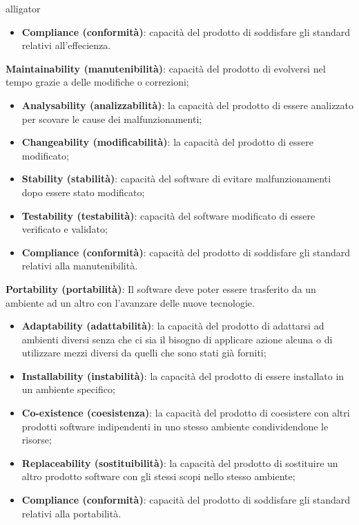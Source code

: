 \begin{labeling}{alligator}
\begin{itemize}
		\item \textbf{Compliance (conformità)}: capacità del prodotto di soddisfare gli standard relativi all'effecienza.
		
	\end{itemize}
	
	\item \textbf{Maintainability (manutenibilità)}: capacità del prodotto di evolversi nel tempo grazie a delle modifiche o correzioni;
	\begin{itemize}
		\item \textbf{Analysability (analizzabilità)}: la capacità del prodotto di essere analizzato per scovare le cause dei malfunzionamenti;
		
		\item \textbf{Changeability (modificabilità)}: la capacità del prodotto di essere modificato;
		
		\item \textbf{Stability (stabilità)}: capacità del software di evitare malfunzionamenti dopo essere stato modificato;
		
		\item \textbf{Testability (testabilità)}: capacità del software modificato di essere verificato e validato;
		
		\item \textbf{Compliance (conformità)}: capacità del prodotto di soddisfare gli standard relativi alla manutenibilità.
	\end{itemize}
	
	\item \textbf{Portability (portabilità)}: Il software deve poter essere trasferito da un ambiente ad un altro con l'avanzare delle nuove tecnologie.
	\begin{itemize}
		\item \textbf{Adaptability (adattabilità)}: la capacità del prodotto di adattarsi ad ambienti diversi senza che ci sia il bisogno di applicare azione alcuna o di utilizzare mezzi diversi da quelli che sono stati già forniti;
		
		\item \textbf{Installability (instabilità)}: la capacità del prodotto di essere installato in un ambiente specifico;
		
		\item \textbf{Co-existence (coesistenza)}: la capacità del prodotto di coesistere con altri prodotti software indipendenti in uno stesso ambiente condividendone le risorse;
		
		\item \textbf{Replaceability (sostituibilità)}: la capacità del prodotto di sostituire un altro prodotto software con gli stessi scopi nello stesso ambiente;
		
		\item \textbf{Compliance (conformità)}: capacità del prodotto di soddisfare gli standard relativi alla portabilità.
	\end{itemize}
\end{labeling}


